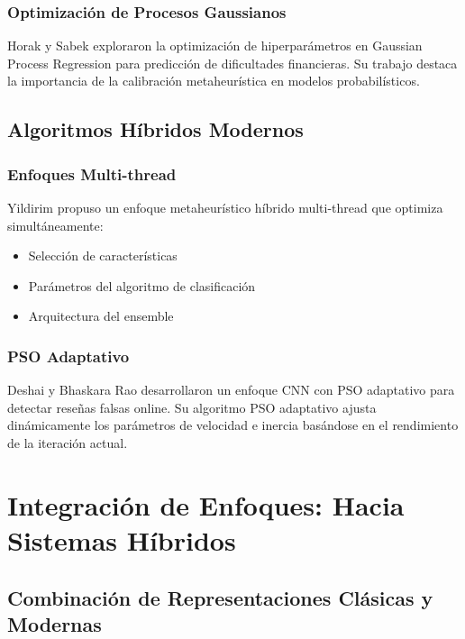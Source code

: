 \subsubsection{Optimización de Procesos Gaussianos}

Horak y Sabek \cite{horak2023gaussian} exploraron la optimización de hiperparámetros en Gaussian Process Regression para predicción de dificultades financieras. Su trabajo destaca la importancia de la calibración metaheurística en modelos probabilísticos.

\subsection{Algoritmos Híbridos Modernos}

\subsubsection{Enfoques Multi-thread}

Yildirim \cite{yildirim2023novel} propuso un enfoque metaheurístico híbrido multi-thread que optimiza simultáneamente:
\begin{itemize}
    \item Selección de características
    \item Parámetros del algoritmo de clasificación
    \item Arquitectura del ensemble
\end{itemize}

\subsubsection{PSO Adaptativo}

Deshai y Bhaskara Rao \cite{deshai2023unmasking} desarrollaron un enfoque CNN con PSO adaptativo para detectar reseñas falsas online. Su algoritmo PSO adaptativo ajusta dinámicamente los parámetros de velocidad e inercia basándose en el rendimiento de la iteración actual.

\section{Integración de Enfoques: Hacia Sistemas Híbridos}
\label{sec:integracion_enfoques}

\subsection{Combinación de Representaciones Clásicas y Modernas}

